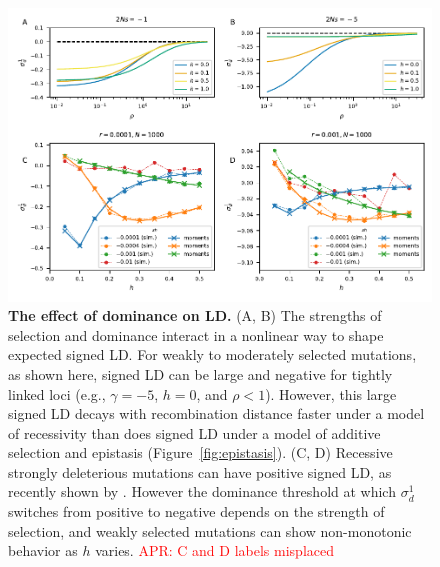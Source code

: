 \documentclass[]{article}
\newcommand{\comment}[1]{{\textcolor{red}{APR: #1}}}
\begin{document}
\begin{figure}[tb!]
    \centering
    \includegraphics{../figures/dominance_roze}
    \caption{
        \textbf{The effect of dominance on LD.}
        (A, B) The strengths of selection and dominance interact in a nonlinear way
        to shape expected signed LD. For weakly to moderately selected mutations,
        as shown here, signed LD can be large and negative for tightly linked loci
        (e.g., \(\gamma=-5\), \(h=0\), and \(\rho < 1\)). However, this large signed
        LD decays with recombination distance faster under a model of recessivity
        than does signed LD under a model of additive selection and
        epistasis (Figure~\ref{fig:epistasis}).
        (C, D) Recessive strongly deleterious mutations can have positive signed
        LD, as recently shown by \citet{Roze2021-cf}.
        However the dominance threshold at which \(\sigma_d^1\) switches from
        positive to negative depends on the strength of selection, and weakly
        selected mutations can show non-monotonic behavior as $h$ varies.
        \comment{C and D labels misplaced}
    }
    \label{fig:dominance}
\end{figure}
\end{document}
